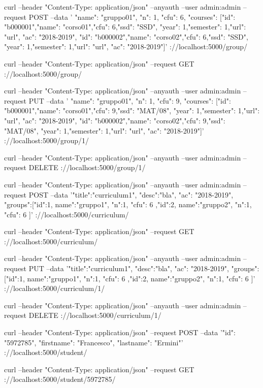 \documentclass{article}
\begin{document}
\begin{shell}[caption=CRUD group]
curl --header "Content-Type: application/json" --anyauth --user admin:admin --request POST --data '{ "name": "gruppo01", "n": 1, "cfu":  6, "courses": [{"id": "b000001","name": "corso01","cfu": 6,"ssd": "SSD", "year": 1,"semester": 1,"url": "url", "ac": "2018-2019"}, {"id": "b000002","name": "corso02","cfu": 6,"ssd": "SSD", "year": 1,"semester": 1,"url": "url", "ac": "2018-2019"}]}' \http://localhost:5000/group/

curl --header "Content-Type: application/json" --request GET \http://localhost:5000/group/

curl --header "Content-Type: application/json" --anyauth --user admin:admin --request PUT --data '{ "name": "gruppo01", "n": 1, "cfu":  9, "courses": [{"id": "b000001","name": "corso01","cfu": 9,"ssd": "MAT/08", "year": 1,"semester": 1,"url": "url", "ac": "2018-2019"}, {"id": "b000002","name": "corso02","cfu": 9,"ssd": "MAT/08", "year": 1,"semester": 1,"url": "url", "ac": "2018-2019"}]}' \http://localhost:5000/group/1/

curl --header "Content-Type: application/json" --anyauth --user admin:admin --request DELETE \http://localhost:5000/group/1/
\end{shell}


\begin{shell}[caption=CRUD curriculum]
curl --header "Content-Type: application/json" --anyauth --user admin:admin --request POST --data '{"title":"curriculum1", "desc":"bla", "ac": "2018-2019", "groups":[{"id":1, name":"gruppo1", "n":1, "cfu": 6 },{"id":2, name":"gruppo2", "n":1, "cfu": 6 }]}' \http://localhost:5000/curriculum/

curl --header "Content-Type: application/json" --request GET \http://localhost:5000/curriculum/

curl --header "Content-Type: application/json" --anyauth --user admin:admin --request PUT --data '{"title":"curriculum1", "desc":"bla", "ac": "2018-2019", "groups":[{"id":1, name":"gruppo1", "n":1, "cfu": 6 },{"id":2, name":"gruppo2", "n":1, "cfu": 6 }]}' \http://localhost:5000/curriculum/1/

curl --header "Content-Type: application/json" --anyauth --user admin:admin --request DELETE  \http://localhost:5000/curriculum/1/
\end{shell}

\begin{shell}[caption=CRUD Student]
curl --header "Content-Type: application/json"  --request POST --data '{"id": "5972785", "firstname": "Francesco", "lastname": "Ermini"}' \http://localhost:5000/student/

curl --header "Content-Type: application/json" --request GET \http://localhost:5000/student/5972785/
\end{shell}
\end{document}
